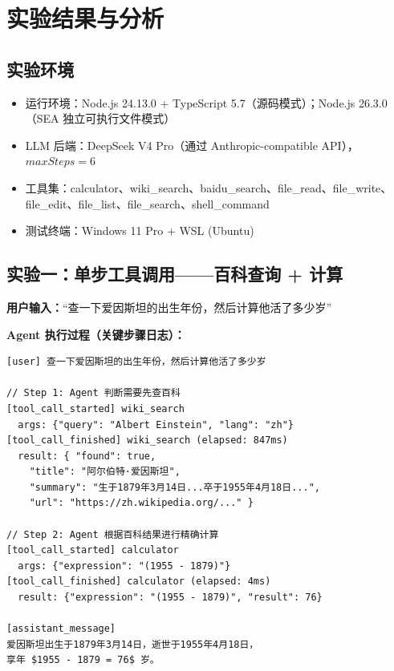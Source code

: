 \documentclass[12pt,a4paper]{ctexart}
\begin{document}
\newpage
\section{实验结果与分析}

\subsection{实验环境}

\begin{itemize}
  \item 运行环境：Node.js 24.13.0 + TypeScript 5.7（源码模式）；Node.js
    26.3.0（SEA 独立可执行文件模式）
  \item LLM 后端：DeepSeek V4 Pro（通过 Anthropic-compatible
    API），$maxSteps=6$
  \item
    工具集：calculator、wiki\_search、baidu\_search、file\_read、file\_write、
    file\_edit、file\_list、file\_search、shell\_command
  \item 测试终端：Windows 11 Pro + WSL (Ubuntu)
\end{itemize}

\subsection{实验一：单步工具调用——百科查询 + 计算}

\textbf{用户输入：}``查一下爱因斯坦的出生年份，然后计算他活了多少岁''

\textbf{Agent 执行过程（关键步骤日志）：}

\begin{lstlisting}[caption={Agent 多步推理完整日志}, label={lst:log}, basicstyle=\ttfamily\footnotesize]
[user] 查一下爱因斯坦的出生年份，然后计算他活了多少岁

// Step 1: Agent 判断需要先查百科
[tool_call_started] wiki_search
  args: {"query": "Albert Einstein", "lang": "zh"}
[tool_call_finished] wiki_search (elapsed: 847ms)
  result: { "found": true,
    "title": "阿尔伯特·爱因斯坦",
    "summary": "生于1879年3月14日...卒于1955年4月18日...",
    "url": "https://zh.wikipedia.org/..." }

// Step 2: Agent 根据百科结果进行精确计算
[tool_call_started] calculator
  args: {"expression": "(1955 - 1879)"}
[tool_call_finished] calculator (elapsed: 4ms)
  result: {"expression": "(1955 - 1879)", "result": 76}

[assistant_message]
爱因斯坦出生于1879年3月14日，逝世于1955年4月18日，
享年 $1955 - 1879 = 76$ 岁。
\end{lstlisting}
\end{document}
